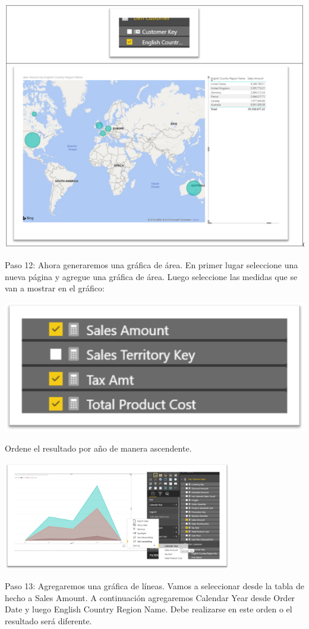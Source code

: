 \documentclass[12pt,letterpaper]{article}
\begin{document}
\begin{center}
    \includegraphics[width=16cm]{img/11.png}  
\end{center}
Paso 12: Ahora generaremos una gráfica de área.
En primer lugar seleccione una nueva página y agregue una gráfica de área. Luego seleccione las medidas que se van a mostrar en el gráfico:
\begin{center}
    \includegraphics[width=16cm]{img/13.png}  
\end{center}
Ordene el resultado por año de manera ascendente.
\begin{center}
    \includegraphics[width=10cm]{img/14.png}  
\end{center}
Paso 13: Agregaremos una gráfica de líneas. Vamos a seleccionar desde la tabla de hecho a Sales Amount.
A continuación agregaremos Calendar Year desde Order Date y luego English Country Region Name. Debe realizarse en este orden o el resultado será diferente.
\end{document}
